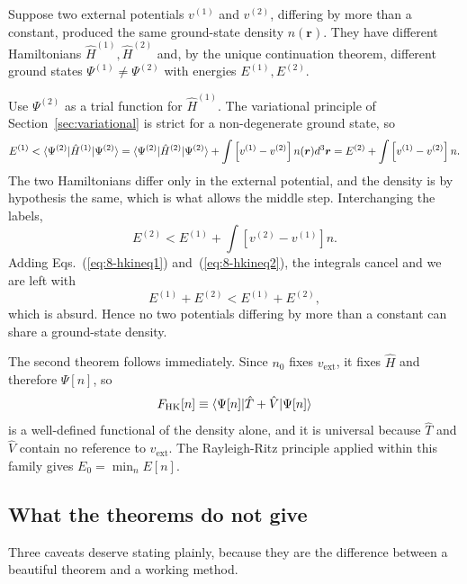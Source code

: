 Suppose two external potentials $v^{(1)}$ and $v^{(2)}$, differing by more
than a constant, produced the same ground-state density $n(\bm{r})$.  They have
different Hamiltonians $\hat{H}^{(1)},\hat{H}^{(2)}$ and, by the unique
continuation theorem, different ground states
$\Psi^{(1)}\ne\Psi^{(2)}$ with energies $E^{(1)},E^{(2)}$.

Use $\Psi^{(2)}$ as a trial function for $\hat{H}^{(1)}$.  The variational
principle of Section~\ref{sec:variational} is strict for a non-degenerate
ground state, so
\begin{equation}
  E^{(1)} < \langle \Psi^{(2)} | \hat{H}^{(1)} | \Psi^{(2)} \rangle
   = \langle \Psi^{(2)} | \hat{H}^{(2)} | \Psi^{(2)} \rangle
   + \int\left[v^{(1)}-v^{(2)}\right]n(\bm{r})d^3\bm{r}
   = E^{(2)} + \int\left[v^{(1)}-v^{(2)}\right]n .
  \label{eq:8-hkineq1}
\end{equation}
The two Hamiltonians differ only in the external potential, and the density is
by hypothesis the same, which is what allows the middle step.  Interchanging
the labels,
\begin{equation}
  E^{(2)} < E^{(1)} + \int\left[v^{(2)}-v^{(1)}\right]n .
  \label{eq:8-hkineq2}
\end{equation}
Adding Eqs.~(\ref{eq:8-hkineq1}) and~(\ref{eq:8-hkineq2}), the integrals
cancel and we are left with
\begin{equation}
  E^{(1)} + E^{(2)} < E^{(1)} + E^{(2)},
  \label{eq:8-hkcontradiction}
\end{equation}
which is absurd.  Hence no two potentials differing by more than a constant
can share a ground-state density.

The second theorem follows immediately.  Since $n_0$ fixes
$v_{\mathrm{ext}}$, it fixes $\hat{H}$ and therefore $\Psi[n]$, so
\begin{equation}
  F_{\mathrm{HK}}[n] \equiv \langle \Psi[n] | \hat{T}+\hat{V} | \Psi[n] \rangle
  \label{eq:8-fhk}
\end{equation}
is a well-defined functional of the density alone, and it is universal
because $\hat{T}$ and $\hat{V}$ contain no reference to
$v_{\mathrm{ext}}$.  The Rayleigh-Ritz principle applied within this family
gives $E_0=\min_{n}E[n]$.

\subsection{What the theorems do not give}
\label{sec:hkcaveats}

Three caveats deserve stating plainly, because they are the difference
between a beautiful theorem and a working method.

